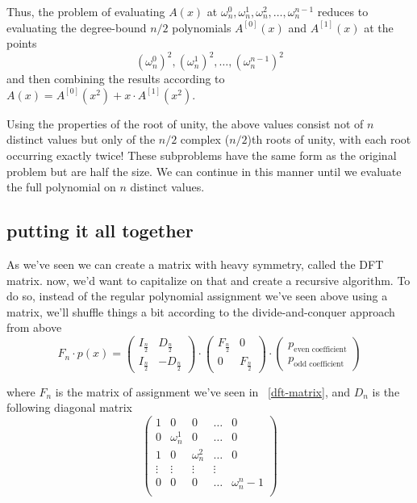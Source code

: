 Thus, the problem of evaluating $A(x)$ at 
$\omega_n^0, \omega_n^1, \omega_n^2,\dots, \omega_n^{n-1}$ 
reduces to evaluating the degree-bound $n/2$ polynomials  $A^{[0]}(x)$ and $A^{[1]}(x)$ at the points
$$(\omega_n^0)^2, (\omega_n^1)^2,\dots, (\omega_n^{n-1})^2$$
and then combining the results according to $A(x)=A^{[0]}(x^2) + x\cdot A^{[1]}(x^2)$.


Using the properties of the root of unity, 
the above values consist not of $n$ distinct values but only of the $n/2$
 complex ($n/2$)th roots of unity, with each root occurring exactly twice!
These subproblems have the same form as the original problem but are half the size.
We can continue in this manner until we evaluate the full polynomial on $n$ distinct values.


\subsection{putting it all together}
As we've seen we can create a matrix with heavy symmetry, called the DFT matrix. 
now, we'd want to capitalize on that and create a recursive algorithm.
To do so, instead of the regular polynomial assignment we've seen above using a matrix,  
we'll shuffle things a bit according to the divide-and-conquer approach from above
$$
F_n \cdot p(x) = 
\begin{pmatrix}
  I_{ \frac{n}{2}} & D_{\frac{n}{2}} \\
  I_{ \frac{n}{2}} & -D_{\frac{n}{2}}
 \end{pmatrix}
 \cdot 
 \begin{pmatrix}
  F_{ \frac{n}{2}} & 0 \\
  0 & F_{ \frac{n}{2}} 
\end{pmatrix}
\cdot 
\begin{pmatrix}
  p_{\text{even coefficient}} \\
  p_{\text{odd coefficient}}
\end{pmatrix}
 $$

 where $F_n$ is the matrix of assignment we've seen in ~\ref{dft-matrix}, and 
 $D_n$ is the following diagonal matrix $$
 \begin{pmatrix}
  1 & 0 &0  & \dots& 0 \\
  0 & \omega_n^1 &0  & \dots& 0 \\
  1 & 0  &\omega_n^2  & \dots& 0 \\
  \vdots & \vdots & \vdots & \vdots &  \\
  0 & 0  &0  & \dots& \omega_n^n-1 \\
 \end{pmatrix} $$


